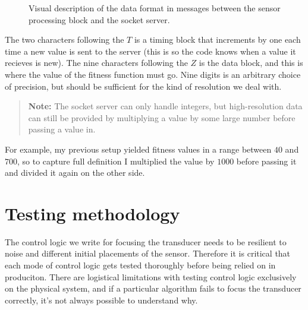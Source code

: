 \documentclass[11pt]{article}
\begin{document}
\begin{figure}[ht]
    \begin{center}
        \caption{Visual description of the data format in messages between the sensor processing block and the socket server.}\label{sec:data_format_fig}
    \end{center}
\end{figure}
The two characters following the $T$ is a timing block that increments by one each time a new value is sent to the server (this is so the code knows when a value it recieves is new). The nine characters following the $Z$ is the data block, and this is where the value of the fitness function must go. Nine digits is an arbitrary choice of precision, but should be sufficient for the kind of resolution we deal with.
\begin{quote}
    \textbf{Note:} The socket server can only handle integers, but high-resolution data can still be provided by multiplying a value by some large number before passing a value in.
\end{quote}
For example, my previous setup yielded fitness values in a range between $40$ and $700$, so to capture full definition I multiplied the value by $1000$ before passing it and divided it again on the other side.


\section{Testing methodology}
The control logic we write for focusing the transducer needs to be resilient to noise and different initial placements of the sensor. Therefore it is critical that each mode of control logic gets tested thoroughly before being relied on in produciton.
There are logistical limitations with testing control logic exclusively on the physical system, and if a particular algorithm fails to focus the transducer correctly, it's not always possible to understand why.
\end{document}
